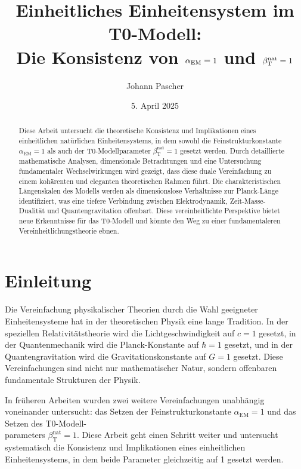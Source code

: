 \documentclass[12pt,a4paper]{article}
\title{Einheitliches Einheitensystem im T0-Modell: \\Die Konsistenz von \(\alphaEM = 1\) und \(\betaT^{\text{nat}} = 1\)}
\author{Johann Pascher}
\date{5. April 2025}
\newcommand{\alphaEM}{\alpha_{\text{EM}}}
\newcommand{\betaT}{\beta_{\text{T}}}
\begin{document}
	
	\maketitle
	
	\begin{abstract}
		Diese Arbeit untersucht die theoretische Konsistenz und Implikationen eines einheitlichen natürlichen Einheitensystems, in dem sowohl die Feinstrukturkonstante \(\alphaEM = 1\) als auch der T0-Modellparameter \(\betaT^{\text{nat}} = 1\) gesetzt werden. Durch detaillierte mathematische Analysen, dimensionale Betrachtungen und eine Untersuchung fundamentaler Wechselwirkungen wird gezeigt, dass diese duale Vereinfachung zu einem kohärenten und eleganten theoretischen Rahmen führt. Die charakteristischen Längenskalen des Modells werden als dimensionslose Verhältnisse zur Planck-Länge identifiziert, was eine tiefere Verbindung zwischen Elektrodynamik, Zeit-Masse-Dualität und Quantengravitation offenbart. Diese vereinheitlichte Perspektive bietet neue Erkenntnisse für das T0-Modell und könnte den Weg zu einer fundamentaleren Vereinheitlichungstheorie ebnen.
	\end{abstract}
	
	\tableofcontents
	\newpage
	
	\section{Einleitung}
	\label{sec:introduction}
	
	Die Vereinfachung physikalischer Theorien durch die Wahl geeigneter Einheitensysteme hat in der theoretischen Physik eine lange Tradition. In der speziellen Relativitätstheorie wird die Lichtgeschwindigkeit auf \(c = 1\) gesetzt, in der Quantenmechanik wird die Planck-Konstante auf \(\hbar = 1\) gesetzt, und in der Quantengravitation wird die Gravitationskonstante auf \(G = 1\) gesetzt. Diese Vereinfachungen sind nicht nur mathematischer Natur, sondern offenbaren fundamentale Strukturen der Physik.
	
	In früheren Arbeiten \cite{pascher_alpha_2025, pascher_alphabeta_2025} wurden zwei weitere Vereinfachungen unabhängig voneinander untersucht: das Setzen der Feinstrukturkonstante \(\alphaEM = 1\) und das Setzen des T0-Modell-\\parameters \(\betaT^{\text{nat}} = 1\). Diese Arbeit geht einen Schritt weiter und untersucht systematisch die Konsistenz und Implikationen eines einheitlichen Einheitensystems, in dem beide Parameter gleichzeitig auf 1 gesetzt werden.
	
\end{document}
